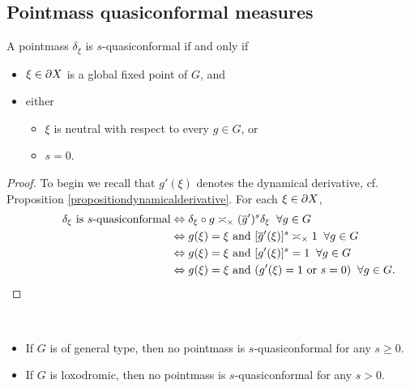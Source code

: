 \subsection{Pointmass quasiconformal measures}
\begin{proposition}
\label{propositionquasiconformalpointmass}
A pointmass $\delta_\xi$ is $s$-quasiconformal if and only if
\begin{itemize}
\item[(I)] $\xi\in\partial X$ is a global fixed point of $G$, and
\item[(II)] either
\begin{itemize}
\item[(IIA)] $\xi$ is neutral with respect to every $g\in G$, or
\item[(IIB)] $s = 0$.
\end{itemize}
\end{itemize}
\end{proposition}
\begin{proof} To begin we recall that $g'(\xi)$ denotes the dynamical derivative, cf. Proposition \ref{propositiondynamicalderivative}.
For each $\xi\in\partial X$,
\begin{align*} 
\text{$\delta_\xi$ is $s$-quasiconformal}
&\Leftrightarrow \delta_\xi\circ g \asymp_\times (\overline g')^s\delta_\xi \all g\in G\\
&\Leftrightarrow \text{$g(\xi) = \xi$ and $[\overline g'(\xi)]^s \asymp_\times 1$} \all g\in G\\
&\Leftrightarrow \text{$g(\xi) = \xi$ and $[g'(\xi)]^s = 1$} \all g\in G\\
&\Leftrightarrow \text{$g(\xi) = \xi$ and ($g'(\xi) = 1$ or $s = 0$)} \all g\in G.\noreason
\end{align*}
\end{proof}

\begin{corollary}
\label{corollaryquasiconformalpointmass}
~
\begin{itemize}
\item[(i)] If $G$ is of general type, then no pointmass is $s$-quasiconformal for any $s\geq 0$.
\item[(ii)] If $G$ is loxodromic, then no pointmass is $s$-quasiconformal for any $s > 0$.
\end{itemize}
\end{corollary}

